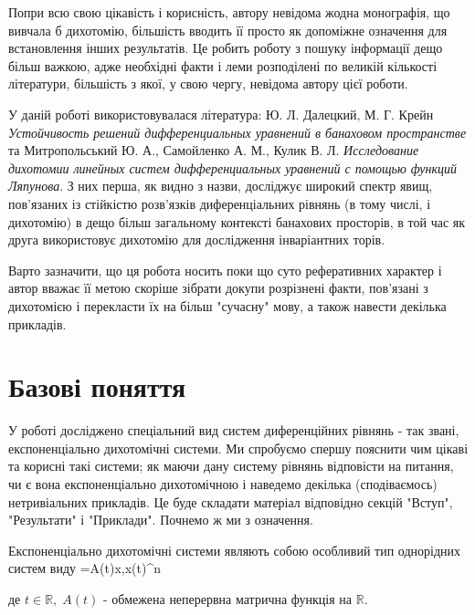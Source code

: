\documentclass[14pt]{extarticle} %
\begin{document}
Попри всю свою цікавість і корисність, автору невідома жодна монографія, що вивчала б дихотомію, більшість вводить її просто як допоміжне
означення для встановлення інших результатів. Це робить роботу з пошуку інформації дещо більш важкою, адже необхідні факти і леми
розподілені по великій кількості літератури, більшість з якої, у свою чергу, невідома автору цієї роботи.

У даній роботі використовувалася література: Ю. Л. Далецкий, М. Г. Крейн
\emph{Устойчивость решений дифференциальных уравнений в банаховом пространстве} та Митропольський Ю. А., Самойленко А. М., Кулик В. Л.
\emph{Исследование дихотомии линейных систем дифференциальных уравнений с помощью функций Ляпунова}. З них перша, як видно з назви,
досліджує широкий спектр явищ, пов’язаних із стійкістю розв’язків диференціальних рівнянь (в тому числі, і дихотомію) в дещо
більш загальному контексті банахових просторів, в той час як друга використовує дихотомію для дослідження інваріантних торів.

Варто зазначити, що ця робота носить поки що суто реферативних характер і автор вважає її метою скоріше зібрати докупи розрізнені факти, пов’язані
з дихотомією і перекласти їх на більш "сучасну{}"{} мову, а також навести декілька прикладів.
\section{Базові поняття}
У роботі досліджено спеціальний вид систем диференційних рівнянь - так звані, експоненціально дихотомічні системи.
Ми спробуємо спершу пояснити чим цікаві та корисні такі системи; як маючи дану систему рівнянь відповісти на питання, чи
є вона експоненціально дихотомічною і наведемо декілька (сподіваємось) нетривіальних прикладів. Це буде складати матеріал
відповідно секцій "Вступ"{}, "Результати" і "Приклади". 
Почнемо ж ми з означення.

Експоненціально дихотомічні системи являють собою особливий тип однорідних систем виду
\equation\label{LinHomSysDef}=A(t)x,\;x(t)\in{}^n\endequation

де $t\in\mathbb{R},\; A(t)$ - обмежена неперервна матрична функція на $\mathbb{R}$. 
\end{document}
